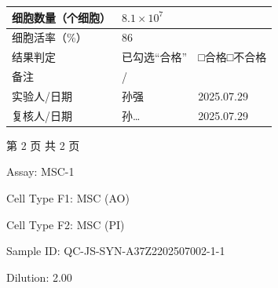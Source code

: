 \documentclass[UTF8,10pt,a4paper,fontset=fandol]{ctexart}
\newcommand{\fieldvalue}[1]{#1}
\newcommand{\handwritten}[1]{#1}
\begin{document}
\begin{center}
\begin{center}
\begin{tabularx}{\textwidth}{|l|X|l|X|}
\hline
细胞数量（个细胞） &
\multicolumn{3}{l|}{%
\fieldvalue{\handwritten{$8.1\times10^{7}$}}} \\
\hline
细胞活率（\%） &
\multicolumn{3}{l|}{%
\fieldvalue{\handwritten{86}}} \\
\hline
结果判定 &
\multicolumn{1}{c|}{%
\fieldvalue{\handwritten{已勾选“合格”}}} &
\multicolumn{2}{l|}{□合格\qquad □不合格} \\
\hline
备注 &
\multicolumn{3}{l|}{%
\fieldvalue{\handwritten{/}}} \\
\hline
实验人/日期 &
\multicolumn{1}{l|}{%
\fieldvalue{\handwritten{孙强}}} &
\multicolumn{2}{l|}{%
\fieldvalue{\handwritten{2025.07.29}}} \\
\hline
复核人/日期 &
\multicolumn{1}{l|}{%
\fieldvalue{\handwritten{孙\ldots}}} &
\multicolumn{2}{l|}{%
\fieldvalue{\handwritten{2025.07.29}}} \\
\hline
\end{tabularx}

\bigskip
\begin{center}
第 2 页 共 2 页
\end{center}

\newpage

Assay: %
\fieldvalue{MSC-1}

Cell Type F1: %
\fieldvalue{MSC (AO)}

Cell Type F2: %
\fieldvalue{MSC (PI)}

\medskip

Sample ID: %
\fieldvalue{QC-JS-SYN-A37Z2202507002-1-1}

Dilution: %
\fieldvalue{2.00}


\end{center}
\end{center}
\end{document}
